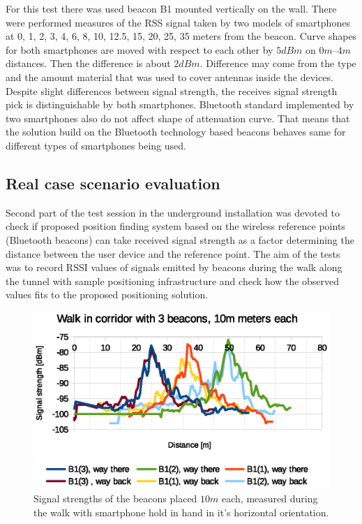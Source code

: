 \documentclass[../main.tex]{subfiles}
\begin{document}
For this test there was used beacon B1 mounted vertically on the wall. There were performed measures of the RSS signal taken by two models of smartphones at 0, 1, 2, 3, 4, 6, 8, 10, 12.5, 15, 20, 25, 35 meters from the beacon. Curve shapes for both smartphones are moved with respect to each other by $5dBm$ on $0m$--$4m$ distances. Then the difference is about $2dBm$. Difference may come from the type and the amount material that was used to cover antennas inside the devices. Despite slight differences between signal strength, the receives signal strength pick is distinguishable by both smartphones. Bluetooth standard implemented by two smartphones also do not affect shape of attenuation curve. That means that the solution build on the Bluetooth technology based beacons behaves same for different types of smartphones being used.

\FloatBarrier
\subsection{Real case scenario evaluation} %
\label{sub:real_case_scenario_evaluation}

Second part of the test session in the underground installation was devoted to check if proposed position finding system based on the wireless reference points (Bluetooth beacons) can take received signal strength as a factor determining the distance between the user device and the reference point. The aim of the tests was to record RSSI values of signals emitted by beacons during the walk along the tunnel with sample positioning infrastructure and check how the observed values fits to the proposed positioning solution.

\begin{figure}[!htbp]
\includegraphics[width=\textwidth, keepaspectratio]{pictures/tests_case10_walk_10m_raw}
\centering
\caption{Signal strengths of the beacons placed $10m$ each, measured during the walk with smartphone hold in hand in it's horizontal orientation.}
\label{fig:tests_case10_walk_10m_raw}
\end{figure}
\end{document}

